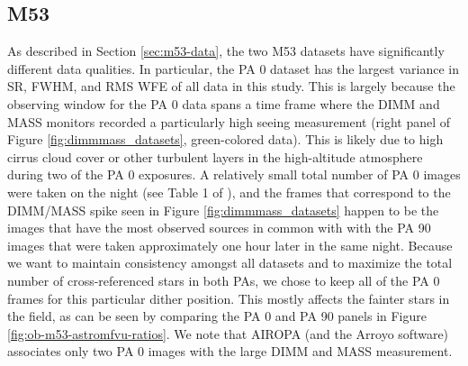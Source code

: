 \documentclass[]{spie}  %
\begin{document}
\subsection{M53} \label{sec:results-m53}
As described in Section \ref{sec:m53-data}, the two M53 datasets have significantly different data qualities. In particular, the PA 0 dataset has the largest variance in SR, FWHM, and RMS WFE of all data in this study. This is largely because the observing window for the PA 0 data spans a time frame where the DIMM and MASS monitors recorded a particularly high seeing measurement (right panel of Figure \ref{fig:dimmmass_datasets}, green-colored data). This is likely due to high cirrus cloud cover or other turbulent layers in the high-altitude atmosphere during two of the PA 0 exposures. A relatively small total number of PA 0 images were taken on the night (see Table 1 of \cite{service:2016a}), and the frames that correspond to the DIMM/MASS spike seen in Figure \ref{fig:dimmmass_datasets} happen to be the images that have the most observed sources in common with with the PA 90 images that were taken approximately one hour later in the same night. Because we want to maintain consistency amongst all datasets and to maximize the total number of cross-referenced stars in both PAs, we chose to keep all of the PA 0 frames for this particular dither position. This mostly affects the fainter stars in the field, as can be seen by comparing the PA 0 and PA 90 panels in Figure \ref{fig:ob-m53-astromfvu-ratios}. We note that AIROPA (and the Arroyo software) associates only two PA 0 images with the large DIMM and MASS measurement.
\end{document}
